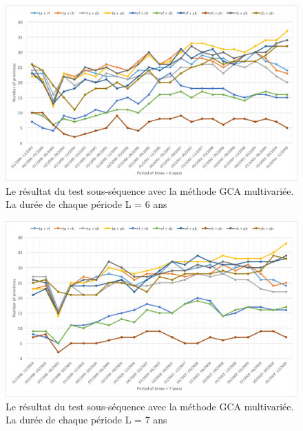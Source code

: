 \begin{figure}[h]
\begin{center}
\includegraphics[width = \linewidth]{../figures/chap5/multi_6.png}
\caption{Le résultat du test sous-séquence avec la méthode GCA multivariée. La durée de chaque période L = 6 ans }
\label{fig_multi6}	
\end{center}
\end{figure}

\begin{figure}[h]
\begin{center}
\includegraphics[width = \linewidth]{../figures/chap5/multi_7.png}
\caption{Le résultat du test sous-séquence avec la méthode GCA multivariée. La durée de chaque période L = 7 ans }
\label{fig_multi7}	
\end{center}
\end{figure}

